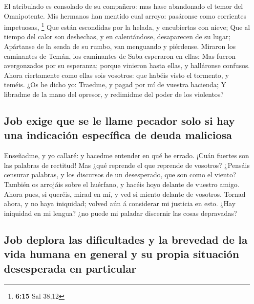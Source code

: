  El atribulado es consolado de su compañero: mas hase
abandonado el temor del Omnipotente.  Mis hermanos han
mentido cual arroyo: pasáronse como corrientes impetuosas, \footnote{\textbf{6:15}
  Sal 38,12}  Que están escondidas por la helada, y
encubiertas con nieve;  Que al tiempo del calor son
deshechas, y en calentándose, desaparecen de su lugar; 
Apártanse de la senda de su rumbo, van menguando y piérdense.
 Miraron los caminantes de Temán, los caminantes de Saba
esperaron en ellas:  Mas fueron avergonzados por su
esperanza; porque vinieron hasta ellas, y halláronse confusos.
 Ahora ciertamente como ellas sois vosotros: que habéis
visto el tormento, y teméis.  ¿Os he dicho yo: Traedme, y
pagad por mí de vuestra hacienda;  Y libradme de la mano
del opresor, y redimidme del poder de los violentos?

\hypertarget{job-exige-que-se-le-llame-pecador-solo-si-hay-una-indicaciuxf3n-especuxedfica-de-deuda-maliciosa}{%
\subsection{Job exige que se le llame pecador solo si hay una indicación
específica de deuda
maliciosa}\label{job-exige-que-se-le-llame-pecador-solo-si-hay-una-indicaciuxf3n-especuxedfica-de-deuda-maliciosa}}

 Enseñadme, y yo callaré: y hacedme entender en qué he
errado.  ¡Cuán fuertes son las palabras de rectitud! Mas
¿qué reprende el que reprende de vosotros?  ¿Pensáis
censurar palabras, y los discursos de un desesperado, que son como el
viento?  También os arrojáis sobre el huérfano, y hacéis
hoyo delante de vuestro amigo.  Ahora pues, si queréis,
mirad en mí, y ved si miento delante de vosotros.  Tornad
ahora, y no haya iniquidad; volved aún á considerar mi justicia en esto.
 ¿Hay iniquidad en mi lengua? ¿no puede mi paladar
discernir las cosas depravadas?

\hypertarget{job-deplora-las-dificultades-y-la-brevedad-de-la-vida-humana-en-general-y-su-propia-situaciuxf3n-desesperada-en-particular}{%
\subsection{Job deplora las dificultades y la brevedad de la vida humana
en general y su propia situación desesperada en
particular}\label{job-deplora-las-dificultades-y-la-brevedad-de-la-vida-humana-en-general-y-su-propia-situaciuxf3n-desesperada-en-particular}}

